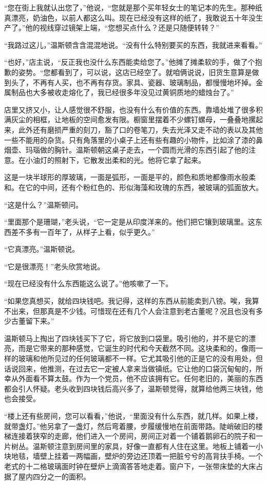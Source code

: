 ``您在街上我就认出您了，''他说，``您就是那个买年轻女士的笔记本的先生。那种纸真漂亮，奶油色，以前人都这么叫。现在已经没有这样的纸了，我敢说五十年没生产了。''他的视线穿过镜架上端，``您想买点什么？还是只随便转转？''

``我路过这儿，''温斯顿含含混混地说。``没有什么特别要买的东西，我就进来看看。''

``也好，''店主说，``反正我也没什么东西能卖给您了。''他摊了摊柔软的手，做了个抱歉的姿势。``您都看到了，可以说，这店已经空了。就咱俩说说，旧货生意算是做到头了，不再有人买，也不再有存货。家具、瓷器、玻璃制品，都慢慢地坏掉。金属制品也大多被收走熔化了，我已经很多年没见过黄铜质地的蜡烛台了。''

店里又挤又小，让人感觉很不舒服，也没有什么有价值的东西。靠墙处堆了很多积满灰尘的相框，让地板的空间愈发有限。橱窗里摆着不少螺钉螺母，一叠叠地摞起来，此外还有磨损严重的刻刀，豁了口的卷笔刀，失去光泽又走不动的表以及其他一些不能用的杂货。只有角落里的小桌子上还有些有趣的小物件，比如涂了漆的鼻烟壶、玛瑙做的胸针。温斯顿朝这桌子走去，一个圆而光滑的东西引起了他的注意。在小油灯的照射下，它散发出柔和的光。他将它拿了起来。

这是一块半球形的厚玻璃，一面是弧形，一面是平的，颜色和质地都像雨水般柔和。在它的中间，还有个粉红色的、形似海藻和玫瑰的东西，被玻璃的弧面放大。

``这是什么？''温斯顿问。

``里面那个是珊瑚，''老头说，``它一定是从印度洋来的。他们把它镶到玻璃里。这东西差不多有一百年了，从样子上看，似乎更久。''

``它真漂亮。''温斯顿说。

``它是很漂亮！''老头欣赏地说。

``现在已经没有什么东西能这么说了。''他咳嗽了一下。

``如果您真想买，就给四块钱吧。我记得，这样的东西从前能卖到八镑。唉，我算不出来，但那真是不少钱。可惜现在还有几个人会注意到老古董呢？况且也没有多少古董留下来。''

温斯顿马上掏出了四块钱买下了它，将它放到口袋里。吸引他的，并不是它的漂亮，而是它带来的那种感觉，它诞生的时代和今天截然不同。这块柔和的，像雨一样的玻璃和他所见过的任何玻璃都不一样。它尤其吸引他的正是它的没有用处，但话说回来，他推测，在过去它一定被人拿来当做镇纸。它让他的口袋沉甸甸的，所幸从外面看不算太鼓。作为一个党员，他不应该拥有它。任何老旧的，美丽的东西都会引人怀疑。老头收到四块钱后高兴多了，温斯顿觉得，就算给他两三块钱，他也会接受。

``楼上还有些房间，您可以看看，''他说，``里面没有什么东西，就几样。如果上楼，就带盏灯。''他另拿了一盏灯，然后弯着腰，步履缓慢地在前面带路。陡峭破旧的楼梯连接着狭窄的走廊，他们进入一个房间，房间正对着一个铺着鹅卵石的院子和一片树丛。温斯顿注意到房间里的家具，好像一直都有人住在这里。地板上铺着一小块地毯，墙壁上挂着一两幅画，壁炉的旁边还顶着一把脏兮兮的高背扶手椅。一个老式的十二格玻璃面时钟在壁炉上滴滴答答地走着。窗户下，一张带床垫的大床占据了屋内四分之一的面积。

